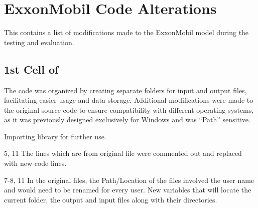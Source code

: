 \chapter{ExxonMobil Code Alterations}
\label{ch:appendixexxonmobil}
This \appendixname{} contains a list of modifications made to the ExxonMobil model during the testing and evaluation.

 

\section{1st Cell of }

The code was organized by creating separate folders for input and output files, facilitating easier usage and data storage. Additional modifications were made to the original source code to ensure compatibility with different operating systems, as it was previously designed exclusively for Windows and was ``Path'' sensitive.

\begin{codemodifications}

\begin{codemodification}{1}
Importing  library for further use.
\end{codemodification}

\begin{codemodification}{5, 11}
The lines which are from original file were commented out and replaced with new code lines.
\end{codemodification}

\begin{codemodification}{7-8, 11}
In the original files, the Path/Location of the files involved the user name and would need to be renamed for every user.  New variables that will locate the current folder, the output and input files along with their directories.
\end{codemodification}

\end{codemodifications}

